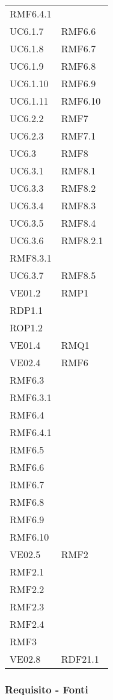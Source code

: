 \begin{longtable}[h!] { >{\centering}m{5cm} >{\centering}m{5cm} }
	 RMF6.4.1
	 \tabularnewline
	 UC6.1.7 & RMF6.6
	 \tabularnewline
	 UC6.1.8 & RMF6.7
	 \tabularnewline
	 UC6.1.9 & RMF6.8
	 \tabularnewline
	 UC6.1.10 & RMF6.9
	 \tabularnewline
	 UC6.1.11 & RMF6.10
	 \tabularnewline
	 UC6.2.2 & RMF7
	 \tabularnewline
	 UC6.2.3 & RMF7.1
	 \tabularnewline
	 UC6.3 & RMF8
	 \tabularnewline
	 UC6.3.1 & RMF8.1
	 \tabularnewline
	 UC6.3.3 & RMF8.2
	 \tabularnewline
	 UC6.3.4 & RMF8.3
	 \tabularnewline
	 UC6.3.5 & RMF8.4
	 \tabularnewline
	 UC6.3.6 & RMF8.2.1 \\ 
	 RMF8.3.1 
	 \tabularnewline
	 UC6.3.7 & RMF8.5
	 \tabularnewline
	 VE01.2 & RMP1 \\
	 RDP1.1 \\
	 ROP1.2 
	 \tabularnewline
	 VE01.4 & RMQ1
	 \tabularnewline
	 VE02.4 & RMF6\\
	 RMF6.3 \\
	 RMF6.3.1 \\
	 RMF6.4 \\
	 RMF6.4.1 \\
	 RMF6.5 \\
	 RMF6.6 \\
	 RMF6.7 \\
	 RMF6.8 \\
	 RMF6.9 \\
	 RMF6.10 
	 \tabularnewline
	 VE02.5 & RMF2 \\
	 RMF2.1 \\
	 RMF2.2 \\
	 RMF2.3 \\
	 RMF2.4 \\
	 RMF3
	 \tabularnewline
	 VE02.8 & RDF21.1
	 \tabularnewline
	
\end{longtable}

\newpage

\subsubsection{Requisito - Fonti}

